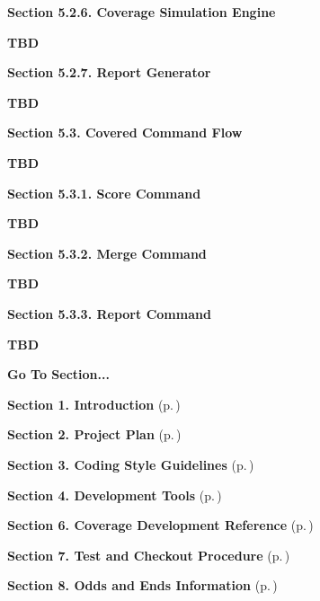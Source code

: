 \begin{Desc}
\item[{\bf Section 5.2.6.  Coverage Simulation Engine}]\par
 {\bf TBD}

\end{Desc}


\begin{Desc}
\item[{\bf Section 5.2.7.  Report Generator}]\par
 {\bf TBD}

\end{Desc}


\begin{Desc}
\item[{\bf Section 5.3.  Covered Command Flow}]\par
 {\bf TBD}\end{Desc}
\begin{Desc}
\item[{\bf Section 5.3.1.  Score Command}]\par
 {\bf TBD}

\end{Desc}


\begin{Desc}
\item[{\bf Section 5.3.2.  Merge Command}]\par
 {\bf TBD}

\end{Desc}


\begin{Desc}
\item[{\bf Section 5.3.3.  Report Command}]\par
 {\bf TBD}

\end{Desc}


\begin{Desc}
\item[{\bf Go To Section...}]\par
\begin{CompactItemize}
\item 
{\bf Section 1.  Introduction} {\rm (p.\,\pageref{page_intro})}\item 
{\bf Section 2.  Project Plan} {\rm (p.\,\pageref{page_project_plan})}\item 
{\bf Section 3.  Coding Style Guidelines} {\rm (p.\,\pageref{page_code_style})}\item 
{\bf Section 4.  Development Tools} {\rm (p.\,\pageref{page_tools})}\item 
{\bf Section 6.  Coverage Development Reference} {\rm (p.\,\pageref{page_code_details})}\item 
{\bf Section 7.  Test and Checkout Procedure} {\rm (p.\,\pageref{page_testing})}\item 
{\bf Section 8.  Odds and Ends Information} {\rm (p.\,\pageref{page_misc})}\end{CompactItemize}
\end{Desc}
